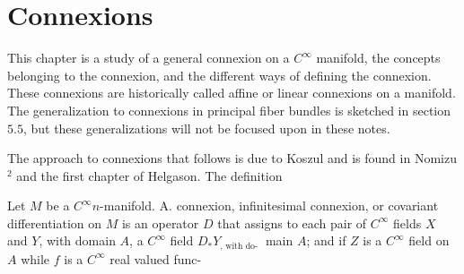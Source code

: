 \documentclass[10pt]{article}
\begin{document}
\section{Connexions}
This chapter is a study of a general connexion on a $C^{\infty}$ manifold, the concepts belonging to the connexion, and the different ways of defining the connexion. These connexions are historically called affine or linear connexions on a manifold. The generalization to connexions in principal fiber bundles is sketched in section $5.5$, but these generalizations will not be focused upon in these notes.

The approach to connexions that follows is due to Koszul and is found in Nomizu ${ }^{2}$ and the first chapter of Helgason. The definition

Let $M$ be a $C^{\infty} n$-manifold. A. connexion, infinitesimal connexion, or covariant differentiation on $M$ is an operator $D$ that assigns to each pair of $C^{\infty}$ fields $X$ and $Y$, with domain $A$, a $C^{\infty}$ field $D_{*} Y_{\text {, with do- }}$ main $A$; and if $Z$ is a $C^{\infty}$ field on $A$ while $f$ is a $C^{\infty}$ real valued func-
\end{document}
